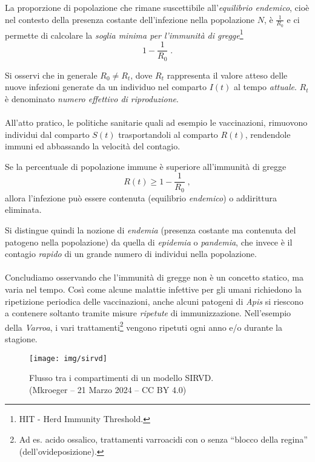 La proporzione di popolazione che rimane suscettibile all'\emph{equilibrio endemico}, cioè nel contesto della presenza
costante dell'infezione nella popolazione $N$, è $\frac{1}{R_0}$ e ci permette di calcolare la
\emph{soglia minima per l'immunità di gregge}\footnote{HIT - Herd Immunity Threshold.}
$$1 - \frac{1}{R_0} \; .$$

Si osservi che in generale $R_0 \neq R_t$, dove $R_t$ rappresenta il valore atteso delle nuove infezioni generate da
un individuo nel comparto $I(t)$ al tempo \emph{attuale}. $R_t$ è denominato \emph{numero effettivo di riproduzione}.

\paragraph{}
All'atto pratico, le politiche sanitarie quali ad esempio le vaccinazioni, rimuovono individui dal comparto $S(t)$
trasportandoli al comparto $R(t)$, rendendole immuni ed abbassando la velocità del contagio.

Se la percentuale di popolazione immune è superiore all'immunità di gregge
$$R(t) \geq 1 - \frac{1}{R_0} \; ,$$
allora l'infezione può essere contenuta (equilibrio \emph{endemico}) o addirittura eliminata.

Si distingue quindi la nozione di \emph{endemia} (presenza costante ma contenuta del patogeno nella popolazione)
da quella di \emph{epidemia} o \emph{pandemia}, che invece è il contagio \emph{rapido} di un grande numero di individui
nella popolazione.

\paragraph{}
Concludiamo osservando che l'immunità di gregge non è un concetto statico, ma varia nel tempo.
Così come alcune malattie infettive per gli umani richiedono la ripetizione periodica delle vaccinazioni,
anche alcuni patogeni di \emph{Apis} si riescono a contenere soltanto tramite misure \emph{ripetute} di
immunizzazione. Nell'esempio della \emph{Varroa}, i vari trattamenti\footnote{Ad es. acido ossalico, trattamenti varroacidi
    con o senza ``blocco della regina'' (\ie dell'ovideposizione).}
vengono ripetuti ogni anno e/o durante la stagione.

\begin{figure}[hbt]
    \centering
    \texttt{[image: img/sirvd]}

    \caption[Flusso tra i compartimenti di un modello SIRVD]{Flusso tra i compartimenti di un modello SIRVD. \\ (Mkroeger -- 21 Marzo 2024 -- CC BY 4.0)}
    \label{img:sirvd}
\end{figure}









